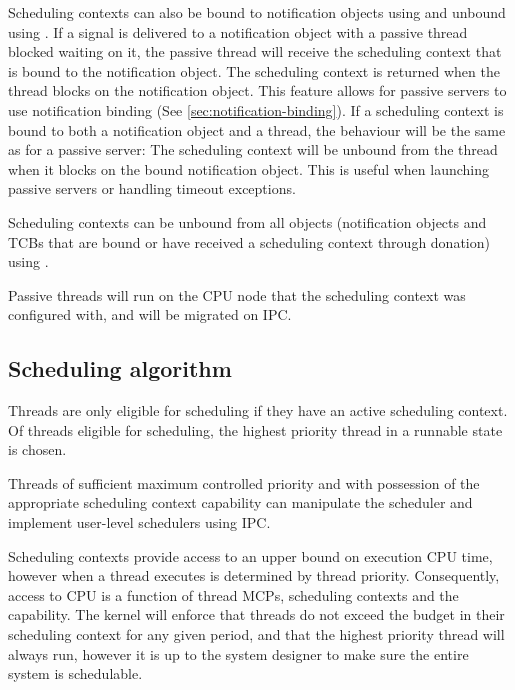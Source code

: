 Scheduling contexts can also be bound to notification objects using
 and unbound using
.  If a signal is delivered to
a notification object with a passive thread blocked waiting on it, the passive thread will receive
the scheduling context that is bound to the notification object.  The scheduling context is returned
when the thread blocks on the notification object.  This feature allows for passive servers to use
notification binding (See \autoref{sec:notification-binding}).  If a scheduling context is bound to
both a notification object and a thread, the behaviour will be the same as for a passive server:
The scheduling context will be unbound from the thread when it blocks on the bound notification object.
This is useful when launching passive servers or handling timeout exceptions.

Scheduling contexts can be unbound from all objects (notification objects and TCBs that are bound or
have received a scheduling context through donation) using
.

Passive threads will run on the CPU node that the scheduling context was configured with, and will
be migrated on IPC.

\subsection{Scheduling algorithm} \label{sec:mcs-sched}

Threads are only eligible for scheduling if they have an active scheduling context.
Of threads eligible for scheduling, the highest priority thread in a runnable state is chosen.

Threads of sufficient maximum controlled priority and with possession of the
appropriate scheduling context capability can manipulate the scheduler and
implement user-level schedulers using IPC.

Scheduling contexts provide access to an upper bound on execution CPU time,
however when a thread executes is determined by thread priority.  Consequently,
access to CPU is a function of thread MCPs, scheduling contexts and the
 capability.  The kernel will enforce that threads do not
exceed the budget in their scheduling context for any given period, and that
the highest priority thread will always run, however it is up to the system
designer to make sure the entire system is schedulable.


